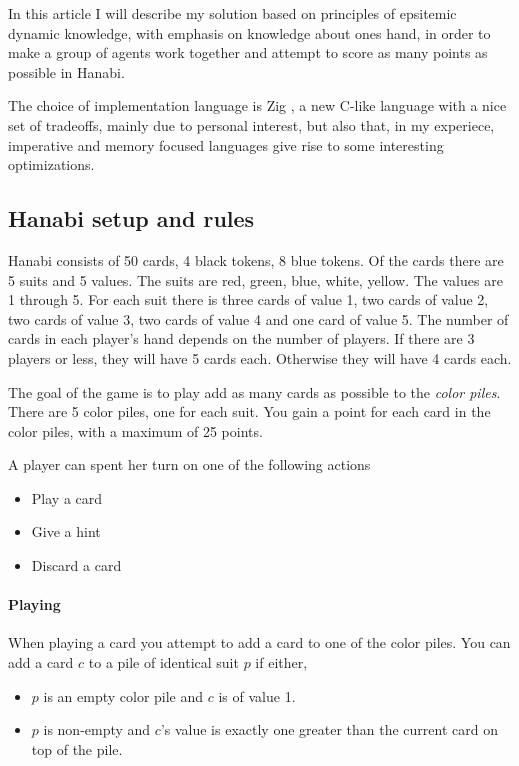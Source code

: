 In this article I will describe my solution based on principles of epsitemic dynamic knowledge, with emphasis on knowledge about ones hand, in order to make a group of agents work together and attempt to score as many points as possible in Hanabi. 

The choice of implementation language is Zig \cite{Ziglang}, a new C-like language with a nice set of tradeoffs, mainly due to personal interest, but also that, in my experiece, imperative and memory focused languages give rise to some interesting optimizations. 




\subsection{Hanabi setup and rules}
Hanabi consists of 50 cards, 4 black tokens, 8 blue tokens.  
Of the cards there are 5 suits and 5 values. 
The suits are red, green, blue, white, yellow. 
The values are 1 through 5. 
For each suit there is three cards of value 1, two cards of value 2, two cards of value 3, two cards of value 4 and one card of value 5.
The number of cards in each player's hand depends on the number of players. If there are 3 players or less, they will have 5 cards each. Otherwise they will have 4 cards each.

The goal of the game is to play add as many cards as possible to the \emph{color piles}. 
There are 5 color piles, one for each suit. You gain a point for each card in the color piles, with a maximum of 25 points.

A player can spent her turn on one of the following actions

\begin{itemize}
\item Play a card
\item Give a hint
\item Discard a card
\end{itemize}

\paragraph{Playing}
When playing a card you attempt to add a card to one of the color piles.
You can add a card $c$ to a pile of identical suit $p$ if either, 

\begin{itemize}	
\item $p$ is an empty color pile and $c$ is of value 1.
\item $p$ is non-empty and $c$'s value is exactly one greater than the current card on top of the pile.
\end{itemize}

